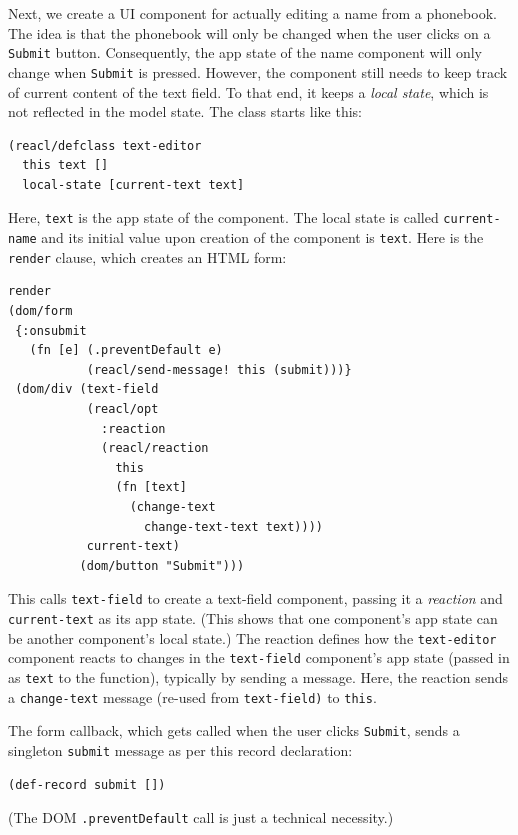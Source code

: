\documentclass[sigplan,screen]{acmart}
\begin{document}
Next, we create a UI component for actually editing a name from a
phonebook.  The idea is that the phonebook will only be changed when
the user clicks on a \texttt{Submit} button.  Consequently, the app
state of the name component will only
change when \texttt{Submit} is pressed.  However, the component still
needs to keep track of current content of the text field.  To that
end, it keeps a \textit{local state}, which is not reflected in the
model state.  The class starts like this:
%
\begin{verbatim}
(reacl/defclass text-editor
  this text []
  local-state [current-text text]
\end{verbatim}
%
Here, \texttt{text} is the app state of the component.  The local
state is called \texttt{current-name} and its initial value upon
creation of the component is \texttt{text}.  Here is the
\texttt{render} clause, which creates an HTML form:
%
\begin{verbatim}
render
(dom/form
 {:onsubmit
   (fn [e] (.preventDefault e)
           (reacl/send-message! this (submit)))}
 (dom/div (text-field
           (reacl/opt
             :reaction
             (reacl/reaction
               this
               (fn [text]
                 (change-text
                   change-text-text text))))
           current-text)
          (dom/button "Submit")))
\end{verbatim}
%
This calls \texttt{text-field} to create a text-field component,
passing it a \textit{reaction} and \texttt{current-text} as its app
state.  (This shows that one component's app state can be another
component's local state.)  The reaction defines how the
\texttt{text-editor} component reacts to changes in the
\texttt{text-field} component's app state (passed in as \texttt{text}
to the function), typically by sending a message.  Here, the reaction
sends a \texttt{change-text} message (re-used from
\texttt{text-field)} to \texttt{this}.

The form callback, which gets called when the user clicks
\texttt{Submit}, sends a singleton \texttt{submit} message as per this
record declaration:
%
\begin{verbatim}
(def-record submit [])
\end{verbatim}
%
(The DOM \texttt{.preventDefault} call is just a technical necessity.)
\end{document}
